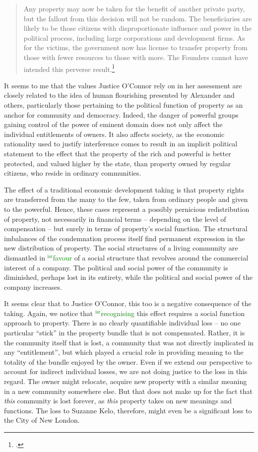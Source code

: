 \documentclass[12pt,a4paper]{book} %
\newcommand{\isr}[1]{\textcolor{green}{$^{\textrm{isr}}${#1}}}
\begin{document}
\begin{quote}
Any property may now be taken for the benefit of another private party, but the fallout from this decision will not be random. The beneficiaries are likely to be those citizens with disproportionate influence and power in the political process, including large corporations and development firms. As for the victims, the government now has license to transfer property from those with fewer resources to those with more. The Founders cannot have intended this perverse result.\footcite[505]{kelo05}
\end{quote}

It seems to me that the values Justice O'Connor rely on in her assessment are closely related to the idea of human flourishing presented by Alexander and others, particularly those pertaining to the political function of property as an anchor for community and democracy. Indeed, the danger of powerful groups gaining control of the power of eminent domain does not only affect the individual entitlements of owners. It also affects society, as the economic rationality used to justify interference comes to result in an implicit political statement to the effect that the property of the rich and powerful is better protected, and valued higher by the state, than property owned by regular citizens, who reside in ordinary communities.

The effect of a traditional economic development taking is that property rights are transferred from the many to the few, taken from ordinary people and given to the powerful. Hence, these cases represent a possibly pernicious redistribution of property, not necessarily in financial terms -- depending on the level of compensation -- but surely in terms of property's social function. The structural imbalances of the condemnation process itself find permanent expression in the new distribution of property. The social structures of a living community are dismantled in \isr{favour} of a social structure that revolves around the commercial interest of a company. The political and social power of the community is diminished, perhaps lost in its entirety, while the political and social power of the company increases.

It seems clear that to Justice O'Connor, this too is a negative consequence of the taking. Again, we notice that \isr{recognising} this effect requires a social function approach to property. There is no clearly quantifiable individual loss -- no one particular ``stick'' in the property bundle that is not compensated. Rather, it is the community itself that is lost, a community that was not directly implicated in any ``entitlement'', but which played a crucial role in providing meaning to the totality of the bundle enjoyed by the owner. Even if we extend our perspective to account for indirect individual losses, we are not doing justice to the loss in this regard. The owner might relocate, acquire new property with a similar meaning in a new community somewhere else. But that does not make up for the fact that {\it this} community is lost forever, as {\it this} property takes on new meanings and functions. The loss to Suzanne Kelo, therefore, might even be a significant loss to the City of New London.
\end{document}
